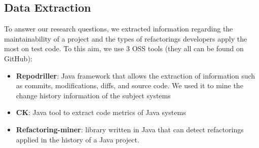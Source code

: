 
\subsection{Data Extraction}
\label{data-extraction}
To answer our research questions, we extracted information regarding the maintainability of a project and the types of refactorings developers apply the most on test code. To this aim, we use 3 OSS tools (they all can be found on GitHub): 
\begin{itemize}
    \item \textbf{Repodriller}: Java framework that allows the extraction of information such as commits, modifications, diffs, and source code. We used it to mine the change history information of the subject systems
    \item \textbf{CK}: Java tool to extract code metrics of Java systems
    \item \textbf{Refactoring-miner}: library written in Java that can detect refactorings applied in the history of a Java project.
\end{itemize}


